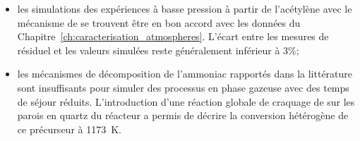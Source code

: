 \begin{itemize}
  \item les simulations des expériences à basse pression à partir de l'acétylène avec le mécanisme de \citet{Norinaga2009} se trouvent être en bon accord avec les données du Chapitre~\ref{ch:caracterisation_atmospheres}. L'écart entre les mesures de  résiduel et les valeurs simulées reste généralement inférieur à 3\%;
  
  \item les mécanismes de décomposition de l'ammoniac rapportés dans la littérature sont insuffisants pour simuler des processus en phase gazeuse avec des temps de séjour réduits. L'introduction d'une réaction globale de craquage de  sur les parois en quartz du réacteur a permis de décrire la conversion hétérogène de ce précurseur à \SI{1173}{\kelvin}.
\end{itemize}



